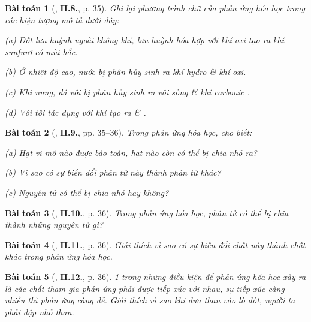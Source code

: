 \documentclass{article}
\numberwithin{equation}{section}
\newtheorem{baitoan}{Bài toán}
\begin{document}
\begin{baitoan}[\cite{Truong_BTNC_Hoa_Hoc_8_2022}, \textbf{II.8.}, p. 35]
	Ghi lại phương trình chữ của phản ứng hóa học trong các hiện tượng mô tả dưới đây:
	\begin{enumerate*}
		\item[(a)] Đốt lưu huỳnh ngoài không khí, lưu huỳnh hóa hợp với khí oxi tạo ra khí sunfurơ \emph{} có mùi hắc.
		\item[(b)] Ở nhiệt độ cao, nước bị phân hủy sinh ra khí hydro \& khí oxi.
		\item[(c)] Khi nung, đá vôi \emph{} bị phân hủy sinh ra vôi sống \emph{} \& khí carbonic \emph{}.
		\item[(d)] Vôi tôi \emph{} tác dụng với khí \emph{} tạo ra \emph{} \& \emph{}.
	\end{enumerate*}
\end{baitoan}

\begin{baitoan}[\cite{Truong_BTNC_Hoa_Hoc_8_2022}, \textbf{II.9.}, pp. 35--36]
	Trong phản ứng hóa học, cho biết:
	\begin{enumerate*}
		\item[(a)] Hạt vi mô nào được bảo toàn, hạt nào còn có thể bị chia nhỏ ra?
		\item[(b)] Vì sao có sự biến đổi phân tử này thành phân tử khác?
		\item[(c)] Nguyên tử có thể bị chia nhỏ hay không?
	\end{enumerate*}
\end{baitoan}

\begin{baitoan}[\cite{Truong_BTNC_Hoa_Hoc_8_2022}, \textbf{II.10.}, p. 36]
	Trong phản ứng hóa học, phân tử \emph{} có thể bị chia thành những nguyên tử gì?
\end{baitoan}

\begin{baitoan}[\cite{Truong_BTNC_Hoa_Hoc_8_2022}, \textbf{II.11.}, p. 36]
	Giải thích vì sao có sự biến đổi chất này thành chất khác trong phản ứng hóa học.
\end{baitoan}

\begin{baitoan}[\cite{Truong_BTNC_Hoa_Hoc_8_2022}, \textbf{II.12.}, p. 36]
	1 trong những điều kiện để phản ứng hóa học xảy ra là các chất tham gia phản ứng phải được tiếp xúc với nhau, sự tiếp xúc càng nhiều thì phản ứng càng dễ. Giải thích vì sao khi đưa than vào lò đốt, người ta phải đập nhỏ than.
\end{baitoan}
\end{document}
